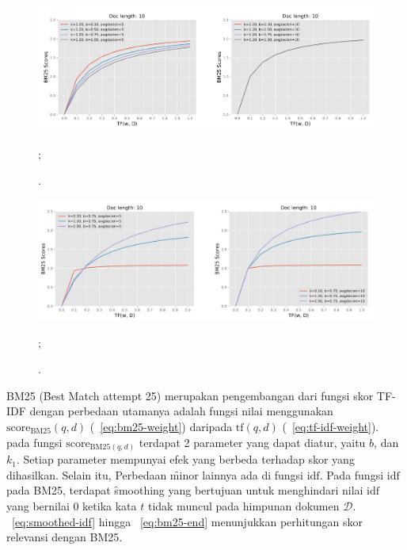     \begin{figure}
        \centering
        \includegraphics[width=1\textwidth]{assets/pics/effect-bm25-param-b.png}
        \caption{\license.};
        \label{fig:effect-bm25-param-b}
    \end{figure}

    \begin{figure}
        \centering
        \includegraphics[width=\textwidth]{assets/pics/effect-bm25-param-k.png}
        \caption{\license.};
        \label{fig:effect-bm25-param-k}
    \end{figure}


    BM25 (\f{Best Match attempt} 25)  merupakan pengembangan dari fungsi skor TF-IDF dengan perbedaan utamanya adalah fungsi nilai menggunakan $\text{score}_{\text{BM25}}(q,d)$ (\equ~\ref{eq:bm25-weight}) daripada $\text{tf}(q,d)$ (\equ~\ref{eq:tf-idf-weight}). pada fungsi $\text{score}_{\text{BM25}(q,d)}$ terdapat 2 parameter yang dapat diatur, yaitu $b$, dan $k_1$. Setiap parameter mempunyai efek yang berbeda terhadap skor yang dihasilkan. Selain itu, Perbedaan \f{minor} lainnya ada di fungsi $\text{idf}$. Pada fungsi $\text{idf}$ pada BM25, terdapat \f{smoothing} yang bertujuan untuk menghindari nilai $\text{idf}$ yang bernilai 0 ketika kata $t$ tidak muncul pada himpunan dokumen $\mathcal{D}$. \equ~\ref{eq:smoothed-idf} hingga \equ~\ref{eq:bm25-end} menunjukkan perhitungan skor relevansi dengan BM25.

